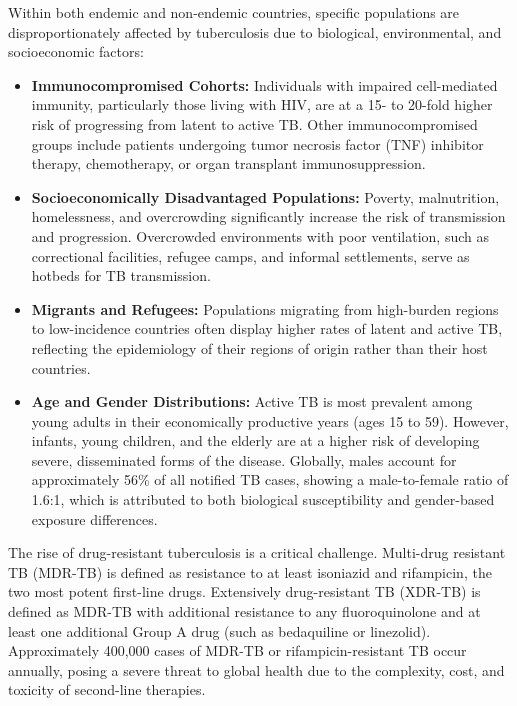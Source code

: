 Within both endemic and non-endemic countries, specific populations are disproportionately affected by tuberculosis due to biological, environmental, and socioeconomic factors:
\begin{itemize}
    \item \textbf{Immunocompromised Cohorts:} Individuals with impaired cell-mediated immunity, particularly those living with HIV, are at a 15- to 20-fold higher risk of progressing from latent to active TB. Other immunocompromised groups include patients undergoing tumor necrosis factor (TNF) inhibitor therapy, chemotherapy, or organ transplant immunosuppression.
    \item \textbf{Socioeconomically Disadvantaged Populations:} Poverty, malnutrition, homelessness, and overcrowding significantly increase the risk of transmission and progression. Overcrowded environments with poor ventilation, such as correctional facilities, refugee camps, and informal settlements, serve as hotbeds for TB transmission.
    \item \textbf{Migrants and Refugees:} Populations migrating from high-burden regions to low-incidence countries often display higher rates of latent and active TB, reflecting the epidemiology of their regions of origin rather than their host countries.
    \item \textbf{Age and Gender Distributions:} Active TB is most prevalent among young adults in their economically productive years (ages 15 to 59). However, infants, young children, and the elderly are at a higher risk of developing severe, disseminated forms of the disease. Globally, males account for approximately 56\% of all notified TB cases, showing a male-to-female ratio of 1.6:1, which is attributed to both biological susceptibility and gender-based exposure differences.
\end{itemize}

The rise of drug-resistant tuberculosis is a critical challenge. Multi-drug resistant TB (MDR-TB) is defined as resistance to at least isoniazid and rifampicin, the two most potent first-line drugs. Extensively drug-resistant TB (XDR-TB) is defined as MDR-TB with additional resistance to any fluoroquinolone and at least one additional Group A drug (such as bedaquiline or linezolid). Approximately 400,000 cases of MDR-TB or rifampicin-resistant TB occur annually, posing a severe threat to global health due to the complexity, cost, and toxicity of second-line therapies.


